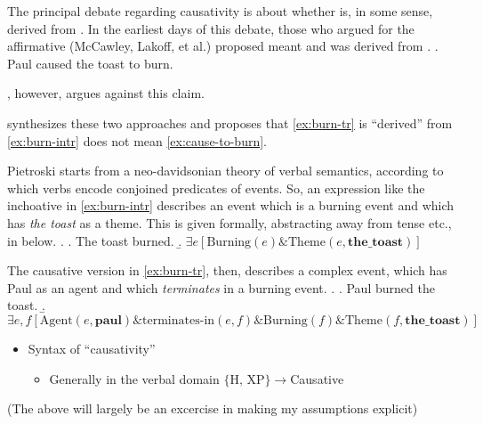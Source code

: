 \documentclass[letterpaper,12pt]{article}
\begin{document}
The principal debate regarding causativity is about whether \Last[a] is, in some sense, derived from \Last[b].
In the earliest days of this debate, those who argued for the affirmative (McCawley, Lakoff, et al.) proposed \Last[a] meant and was derived from \Next.
\ex.\label{ex:cause-to-burn} Paul caused the toast to burn.


\textcite{fodor1970three}, however, argues against this claim.

\textcite{pietroski2003small} synthesizes these two approaches and proposes that \ref{ex:burn-tr} is ``derived'' from \ref{ex:burn-intr} does not mean \ref{ex:cause-to-burn}.

Pietroski starts from a neo-davidsonian theory of verbal semantics, according to which verbs encode conjoined predicates of events.
So, an expression like the inchoative in \ref{ex:burn-intr} describes an event which is a burning event and which has \textit{the toast} as a theme.
This is given formally, abstracting away from tense etc., in \Next[b] below.
\ex.
\a. The toast burned.
\b. $\exists e [\text{Burning}(e) \& \text{Theme}(e, \mathbf{the\_toast})]$

The causative version in \ref{ex:burn-tr}, then, describes a complex event, which has Paul as an agent and which \textit{terminates} in a burning event.
\ex.
\a. Paul burned the toast.
\b. $\exists e,f [\text{Agent}(e, \mathbf{paul}) \& \text{terminates-in}(e,f) \& \text{Burning}(f) \& \text{Theme}(f, \mathbf{the\_toast})]$

\begin{itemize}
  \item Syntax of ``causativity''
    \begin{itemize}
      \item Generally in the verbal domain $\{\text{H, XP}\} \rightarrow $Causative
    \end{itemize}
\end{itemize}

(The above will largely be an excercise in making my assumptions explicit)
\end{document}
